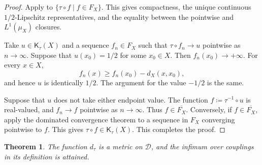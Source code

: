 \documentclass[11pt]{amsart}
\theoremstyle{plain}
\newtheorem{theorem}{Theorem}[section]
\theoremstyle{definition}
\theoremstyle{remark}
\newcommand{\D}{\mathcal D}
\newcommand{\Kc}{\mathsf K}
\newcommand{\dtau}{d_{\tau}}
\begin{document}
\begin{proof}
Apply  to $\{\tau\circ f\mid f\in F_X\}$. This gives compactness, the unique continuous $1/2$-Lipschitz representatives, and the equality between the pointwise and $L^1(\mu_X)$ closures.

Take $u\in\Kc_\tau(X)$ and a sequence $f_n\in F_X$ such that $\tau\circ f_n\to u$ pointwise as $n\to\infty$. Suppose that $u(x_0)=1/2$ for some $x_0\in X$. Then $f_n(x_0)\to+\infty$. For every $x\in X$,
\[
f_n(x)\geq f_n(x_0)-d_X(x,x_0),
\]
and hence $u$ is identically $1/2$. The argument for the value $-1/2$ is the same.

Suppose that $u$ does not take either endpoint value. The function $f\coloneqq\tau^{-1}\circ u$ is real-valued, and $f_n\to f$ pointwise as $n\to\infty$. Thus $f\in\overline{F_X}$. Conversely, if $f\in\overline{F_X}$, apply the dominated convergence theorem \cite[Theorem~3.31, pp.~92--93]{axler2020mira} to a sequence in $F_X$ converging pointwise to $f$. This gives $\tau\circ f\in\Kc_\tau(X)$. This completes the proof.
\end{proof}

\begin{theorem}
\label{thm:dtau-metric}
The function $\dtau$ is a metric on $\D$, and the infimum over couplings in its definition is attained.
\end{theorem}
\end{document}
